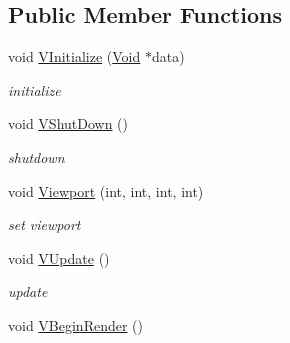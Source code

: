 \subsection*{Public Member Functions}
\begin{DoxyCompactItemize}
\item 
\hypertarget{classPlatform_1_1Renderer_1_1GLX_1_1Renderer_a35ad4d3669113e7bd42b567b2d054185}{
void \hyperlink{classPlatform_1_1Renderer_1_1GLX_1_1Renderer_a35ad4d3669113e7bd42b567b2d054185}{VInitialize} (\hyperlink{structVoid}{Void} $\ast$data)}
\label{classPlatform_1_1Renderer_1_1GLX_1_1Renderer_a35ad4d3669113e7bd42b567b2d054185}

\begin{DoxyCompactList}\small\item\em initialize \item\end{DoxyCompactList}\item 
\hypertarget{classPlatform_1_1Renderer_1_1GLX_1_1Renderer_aa0ac7e91cc8c9009cfeaf67987e277da}{
void \hyperlink{classPlatform_1_1Renderer_1_1GLX_1_1Renderer_aa0ac7e91cc8c9009cfeaf67987e277da}{VShutDown} ()}
\label{classPlatform_1_1Renderer_1_1GLX_1_1Renderer_aa0ac7e91cc8c9009cfeaf67987e277da}

\begin{DoxyCompactList}\small\item\em shutdown \item\end{DoxyCompactList}\item 
\hypertarget{classPlatform_1_1Renderer_1_1GLX_1_1Renderer_a0c6b00217bd25dff897f0eabfd80aa1f}{
void \hyperlink{classPlatform_1_1Renderer_1_1GLX_1_1Renderer_a0c6b00217bd25dff897f0eabfd80aa1f}{Viewport} (int, int, int, int)}
\label{classPlatform_1_1Renderer_1_1GLX_1_1Renderer_a0c6b00217bd25dff897f0eabfd80aa1f}

\begin{DoxyCompactList}\small\item\em set viewport \item\end{DoxyCompactList}\item 
\hypertarget{classPlatform_1_1Renderer_1_1GLX_1_1Renderer_a6ca83ae9a5b6696ecea35d79c05900b6}{
void \hyperlink{classPlatform_1_1Renderer_1_1GLX_1_1Renderer_a6ca83ae9a5b6696ecea35d79c05900b6}{VUpdate} ()}
\label{classPlatform_1_1Renderer_1_1GLX_1_1Renderer_a6ca83ae9a5b6696ecea35d79c05900b6}

\begin{DoxyCompactList}\small\item\em update \item\end{DoxyCompactList}\item 
\hypertarget{classPlatform_1_1Renderer_1_1GLX_1_1Renderer_ac1f41a2c41b01f90d6e7dad63169bba8}{
void \hyperlink{classPlatform_1_1Renderer_1_1GLX_1_1Renderer_ac1f41a2c41b01f90d6e7dad63169bba8}{VBeginRender} ()}
\label{classPlatform_1_1Renderer_1_1GLX_1_1Renderer_ac1f41a2c41b01f90d6e7dad63169bba8}


\end{DoxyCompactItemize}
